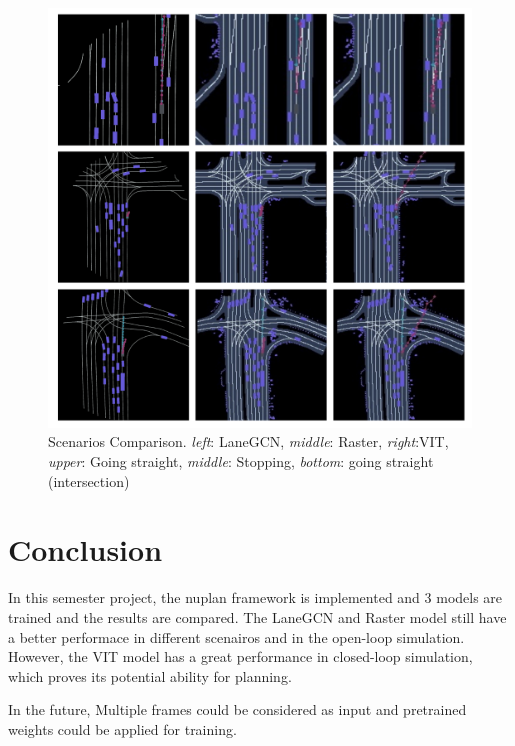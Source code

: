 \documentclass[10pt,conference,compsocconf]{IEEEtran}
\begin{document}
\begin{figure}[!ht]
	\centering
	\includegraphics[width=0.9\linewidth]{Scenarios Comparison.png}
	\caption{Scenarios Comparison. 
 \emph{left}: LaneGCN, \emph{middle}: Raster, \emph{right}:VIT, \emph{upper}: Going straight, \emph{middle}: Stopping, \emph{bottom}: going straight (intersection)
}

    \label{fig:Scenario Comparison}
\end{figure}
\section{Conclusion }
In this semester project, the nuplan framework is implemented and 3 models are trained and the results are compared. The LaneGCN and Raster model still have a better performace in different scenairos and in the open-loop simulation. However, the VIT model has a great performance in closed-loop simulation, which proves its potential ability for planning. 

In the future, Multiple frames could be considered as input and pretrained weights could be applied for training. 















\end{document}
